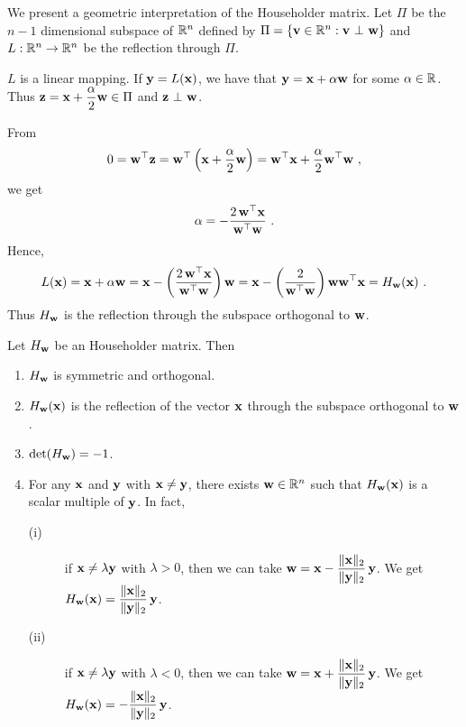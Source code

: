 We present a geometric interpretation of the Householder matrix.  Let
$\Pi$ be the $n-1$ dimensional subspace of $\mathbb{R}^n$ defined by 
$\Pi = \{ \mathbf{v} \in \mathbb{R}^n : \mathbf{v} \operatorname{\,\bot\,} \mathbf{w}\}$ and
$L:\mathbb{R}^n \to \mathbb{R}^n$ be the reflection through $\Pi$.


$L$ is a linear mapping.   If $\mathbf{y} = L(\mathbf{x})$, we have that
$\mathbf{y} = \mathbf{x} + \alpha \mathbf{w}$ for some $\alpha \in \mathbb{R}$.
Thus $\displaystyle \mathbf{z} = \mathbf{x} + \frac{\alpha}{2} \mathbf{w} \in \Pi$
and $\mathbf{z} \operatorname{\,\bot\,} \mathbf{w}$.

From
\[
0 = \VEC{w}^\top \VEC{z}
= \VEC{w}^\top \left( \VEC{x} +  \frac{\alpha}{2} \VEC{w} \right)
= \VEC{w}^\top \VEC{x} +  \frac{\alpha}{2} \VEC{w}^\top \VEC{w} \ ,
\]
we get
\[
  \alpha = - \frac{2\, \mathbf{w}^\top \mathbf{x}}
    {\mathbf{w}^\top\mathbf{w}} \ .
\]
Hence,
\[
L(\mathbf{x}) = \mathbf{x} + \alpha \mathbf{w}
= \mathbf{x} - \left( \frac{2\, \mathbf{w}^\top \mathbf{x}}
{\mathbf{w}^\top\mathbf{w}} \right) \mathbf{w}
= \mathbf{x} - \left(\frac{2}{\mathbf{w}^\top\mathbf{w}}\right)
\mathbf{w} \mathbf{w}^\top \mathbf{x}
= H_{\mathbf{w}}(\mathbf{x}) \ .
\]
Thus $H_{\mathbf{w}}$ is the reflection through the subspace orthogonal
to $\mathbf{w}$.

\begin{theorem}
Let $H_{\mathbf{w}}$ be an \nn Householder matrix.  Then
\begin{enumerate}
\item $H_{\mathbf{w}}$ is symmetric and orthogonal.
\item $H_{\mathbf{w}}(\mathbf{x})$ is the reflection of the vector $\mathbf{x}$
through the subspace orthogonal to $\mathbf{w}$.
\item $\det(H_{\mathbf{w}}) = -1$.
\item \label{C14L7}
For any $\mathbf{x}$ and $\mathbf{y}$ with $\mathbf{x} \neq \mathbf{y}$, there
exists $\mathbf{w} \in \mathbb{R}^n$ such that $H_{\mathbf{w}}(\mathbf{x})$ is a scalar 
multiple of $\mathbf{y}$.  In fact,
\begin{description}
\item[(i)] if $\mathbf{x} \neq \lambda \mathbf{y}$ with $\lambda > 0$, then we can
take $\displaystyle \mathbf{w} = \mathbf{x} -
\frac{\|\mathbf{x}\|_2}{\|\mathbf{y}\|_2}\,\mathbf{y}$.  We get
$\displaystyle H_{\mathbf{w}}(\mathbf{x}) =
\frac{\|\mathbf{x}\|_2}{\|\mathbf{y}\|_2} \, \mathbf{y}$.
\item[(ii)] if $\mathbf{x} \neq \lambda \mathbf{y}$ with $\lambda < 0$, then we can
take $\displaystyle
\mathbf{w} = \mathbf{x} + \frac{\|\mathbf{x}\|_2}{\|\mathbf{y}\|_2}\,\mathbf{y}$.
We get $\displaystyle H_{\mathbf{w}}(\mathbf{x}) =
-\frac{\|\mathbf{x}\|_2}{\|\mathbf{y}\|_2}\,\mathbf{y}$.
\end{description}
\end{enumerate}
\label{C14L8}
\end{theorem}

